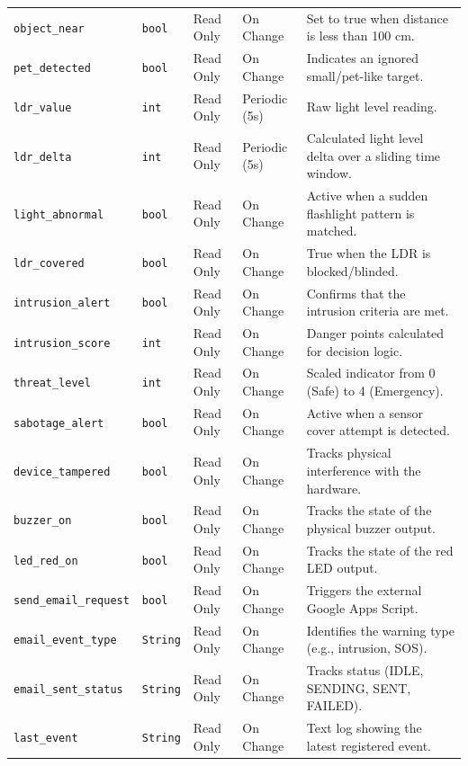 \documentclass[11pt,a4paper]{report}
\begin{document}
\begin{longtable}{lllp{2.5cm}p{4cm}}
\texttt{object\_near} & \texttt{bool} & Read Only & On Change & Set to true when distance is less than 100 cm. \\
\texttt{pet\_detected} & \texttt{bool} & Read Only & On Change & Indicates an ignored small/pet-like target. \\
\texttt{ldr\_value} & \texttt{int} & Read Only & Periodic (5s) & Raw light level reading. \\
\texttt{ldr\_delta} & \texttt{int} & Read Only & Periodic (5s) & Calculated light level delta over a sliding time window. \\
\texttt{light\_abnormal} & \texttt{bool} & Read Only & On Change & Active when a sudden flashlight pattern is matched. \\
\texttt{ldr\_covered} & \texttt{bool} & Read Only & On Change & True when the LDR is blocked/blinded. \\
\texttt{intrusion\_alert} & \texttt{bool} & Read Only & On Change & Confirms that the intrusion criteria are met. \\
\texttt{intrusion\_score} & \texttt{int} & Read Only & On Change & Danger points calculated for decision logic. \\
\texttt{threat\_level} & \texttt{int} & Read Only & On Change & Scaled indicator from 0 (Safe) to 4 (Emergency). \\
\texttt{sabotage\_alert} & \texttt{bool} & Read Only & On Change & Active when a sensor cover attempt is detected. \\
\texttt{device\_tampered} & \texttt{bool} & Read Only & On Change & Tracks physical interference with the hardware. \\
\texttt{buzzer\_on} & \texttt{bool} & Read Only & On Change & Tracks the state of the physical buzzer output. \\
\texttt{led\_red\_on} & \texttt{bool} & Read Only & On Change & Tracks the state of the red LED output. \\
\texttt{send\_email\_request} & \texttt{bool} & Read Only & On Change & Triggers the external Google Apps Script. \\
\texttt{email\_event\_type} & \texttt{String} & Read Only & On Change & Identifies the warning type (e.g., intrusion, SOS). \\
\texttt{email\_sent\_status} & \texttt{String} & Read Only & On Change & Tracks status (IDLE, SENDING, SENT, FAILED). \\
\texttt{last\_event} & \texttt{String} & Read Only & On Change & Text log showing the latest registered event. \\

\end{longtable}
\end{document}
